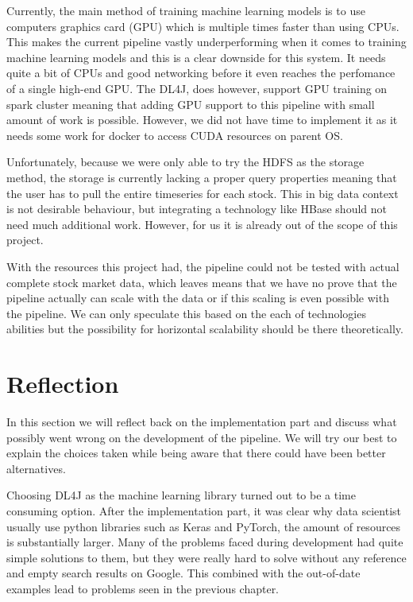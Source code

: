Currently, the main method of training machine learning models is to use computers graphics card (GPU) which is multiple times faster than using CPUs.
This makes the current pipeline vastly underperforming when it comes to training machine learning models and this is a clear downside for this system.
It needs quite a bit of CPUs and good networking before it even reaches the perfomance of a single high-end GPU.
The DL4J, does however, support GPU training on spark cluster meaning that adding GPU support to this pipeline with small amount of work is possible.
However, we did not have time to implement it as it needs some work for docker to access CUDA resources on parent OS.

Unfortunately, because we were only able to try the HDFS as the storage method, the storage is currently lacking a proper query properties meaning that the user has to pull the entire timeseries for each stock.
This in big data context is not desirable behaviour, but integrating a technology like HBase should not need much additional work.
However, for us it is already out of the scope of this project.

With the resources this project had, the pipeline could not be tested with actual complete stock market data, which leaves means that we have no prove that the pipeline actually can scale with the data or if this scaling is even possible with the pipeline.
We can only speculate this based on the each of technologies abilities but the possibility for horizontal scalability should be there theoretically.

\section{Reflection}

In this section we will reflect back on the implementation part and discuss what possibly went wrong on the development of the pipeline.
We will try our best to explain the choices taken while being aware that there could have been better alternatives.

Choosing DL4J as the machine learning library turned out to be a time consuming option.
After the implementation part, it was clear why data scientist usually use python libraries such as Keras and PyTorch, the amount of resources is substantially larger.
Many of the problems faced during development had quite simple solutions to them, but they were really hard to solve without any reference and empty search results on Google.
This combined with the out-of-date examples lead to problems seen in the previous chapter.


